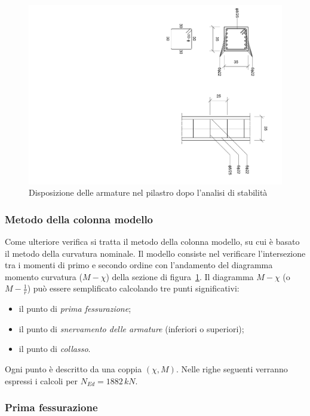 \begin{figure}
	\centering
	\includegraphics[angle=90, width=\textwidth]{../../disposizioneArmaturePilastro_stabilita}
	\caption{Disposizione delle armature nel pilastro dopo l'analisi di stabilità}
	\label{fig:disposizioneArmaturePilastroFinali}
\end{figure}
\cleardoublepage
\subsubsection{Metodo della colonna modello}
Come ulteriore verifica si tratta il metodo della colonna modello, su cui è basato il metodo della curvatura nominale. Il modello consiste nel verificare l'intersezione tra i momenti di primo e secondo ordine con l'andamento del diagramma momento curvatura ($M-\chi$) della sezione di figura~\ref{fig:disposizioneArmaturePilastroFinali}. Il diagramma $M-\chi$ (o $M-\frac{1}{r}$) può essere semplificato calcolando tre punti significativi:
\begin{itemize}
    \item il punto di \emph{prima fessurazione};
    \item il punto di \emph{snervamento delle armature} (inferiori o superiori);
    \item il punto di \emph{collasso}.
\end{itemize}

Ogni punto è descritto da una coppia $(\chi, M)$. Nelle righe seguenti verranno espressi i calcoli per $N_{Ed} = 1882\,kN$.

\subsubsection*{Prima fessurazione}

